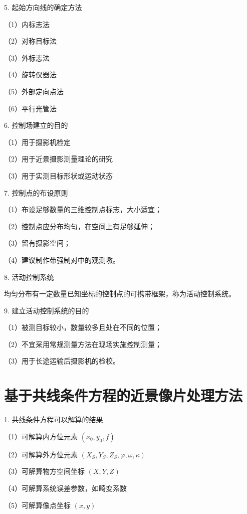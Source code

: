 \documentclass[a4paper]{ctexart}
\begin{document}
5. 起始方向线的确定方法

（1）内标志法

（2）对称目标法

（3）外标志法

（4）旋转仪器法

（5）外部定向点法

（6）平行光管法

6. 控制场建立的目的

（1）用于摄影机检定

（2）用于近景摄影测量理论的研究

（3）用于实测目标形状或运动状态

7. 控制点的布设原则

（1）布设足够数量的三维控制点标志，大小适宜；

（2）控制点应分布均匀，在空间上有足够延伸；

（3）留有摄影空间；

（4）建议制作带强制对中的观测墩。

8. 活动控制系统

均匀分布有一定数量已知坐标的控制点的可携带框架，称为活动控制系统。

9. 建立活动控制系统的目的

（1）被测目标较小，数量较多且处在不同的位置；

（2）不宜采用常规测量方法在现场实施控制测量；

（3）用于长途运输后摄影机的检校。
\newpage
\section{基于共线条件方程的近景像片处理方法}
1. 共线条件方程可以解算的结果

（1）可解算内方位元素 $(x_0,y_0,f)$

（2）可解算外方位元素 $(X_S,Y_S,Z_S,\varphi ,\omega,\kappa)$

（3）可解算物方空间坐标 $(X,Y,Z)$

（4）可解算系统误差参数，如畸变系数

（5）可解算像点坐标 $(x,y)$
\end{document}
